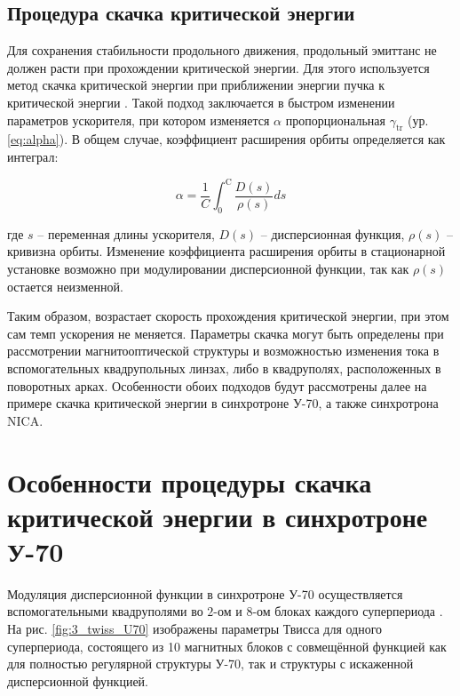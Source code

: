 \newpage
\subsection{Процедура скачка критической энергии}

\par Для сохранения стабильности продольного движения, продольный эмиттанс не должен расти при прохождении критической энергии. Для этого используется метод скачка критической энергии при приближении энергии пучка к критической энергии \cite{risselada:jump}. Такой подход заключается в быстром изменении параметров ускорителя, при котором изменяется $\alpha$ пропорциональная $\gamma_{\textrm{tr}}$ (ур. \ref{eq:alpha}). В общем случае, коэффициент расширения орбиты определяется как интеграл:

\begin{equation}
\alpha=\frac{1}{C} \int_0^{\mathrm{C}} \frac{D(s)}{\rho(s)} d s
\label{eq:alpha_general}
\end{equation}

\noindent где $s$ -- переменная длины ускорителя, $D\left(s\right)$ -- дисперсионная функция, $\rho\left(s\right)$ -- кривизна орбиты. Изменение коэффициента расширения орбиты в стационарной установке возможно при модулировании дисперсионной функции, так как $\rho\left(s\right)$ остается неизменной. 

\par Таким образом, возрастает скорость прохождения критической энергии, при этом сам темп ускорения не меняется. Параметры скачка могут быть определены при рассмотрении магнитооптической структуры и возможностью изменения тока в вспомогательных квадрупольных линзах, либо в квадруполях, расположенных в поворотных арках. Особенности обоих подходов будут рассмотрены далее на примере скачка критической энергии в синхротроне У-70, а также синхротрона NICA.

\section{Особенности процедуры скачка критической энергии в синхротроне У-70}

\par Модуляция дисперсионной функции в синхротроне У-70 осуществляется вспомогательными квадруполями во $2$-ом и $8$-ом блоках каждого суперпериода \cite{cherniy:ihep}. На рис. \ref{fig:3_twiss_U70} изображены параметры Твисса для одного суперпериода, состоящего из 10 магнитных блоков с совмещённой функцией как для полностью регулярной структуры У-70, так и структуры с искаженной дисперсионной функцией.

